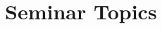 \documentclass[11pt]{article}
\begin{document}

\tableofcontents
\newpage



\section{Seminar Topics}


\end{document}
